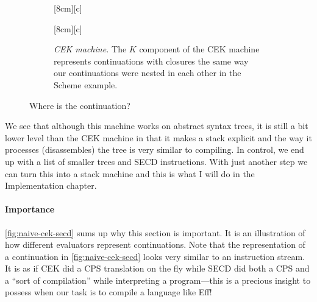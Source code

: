 \documentclass[class=article, crop=false]{standalone}
\begin{document}
\begin{figure}[htb]
  \begin{subfigure}{.5\textwidth}
    [8cm][c]
    {}
    \label{fig:continuation-naive}
  \end{subfigure}
  \begin{subfigure}{.5\textwidth}
    [8cm][c]
    {}
    \label{fig:continuation-secd}
  \end{subfigure}
  \begin{subfigure}{\textwidth}
    \centering
    \caption{\emph{CEK machine.} The $K$ component of the CEK machine represents
    continuations with closures the same way our continuations were nested in each other in the
    Scheme example.}
    \label{fig:continuation-cek}
  \end{subfigure}
  \caption{Where is the continuation?}
  \label{fig:naive-cek-secd}
\end{figure}

We see that although this machine works on abstract syntax trees, it is still a
bit lower level than the CEK machine in that it makes a stack explicit and the
way it processes (disassembles) the tree is very similar to compiling. In
control, we end up with a list of smaller trees and SECD instructions.
With just another step we can turn this into a stack machine and this is what I will
do in the Implementation chapter.

\paragraph{Importance}
\autoref{fig:naive-cek-secd} sums up why this section is important. It is an
illustration of how different evaluators represent continuations. Note that the
representation of a continuation in \autoref{fig:naive-cek-secd} looks
very similar to an instruction stream. It is as if CEK did a CPS translation on
the fly while SECD did both a CPS and a ``sort of compilation'' while
interpreting a program---this is a precious insight to possess when our task is to
compile a language like Eff!
\end{document}
